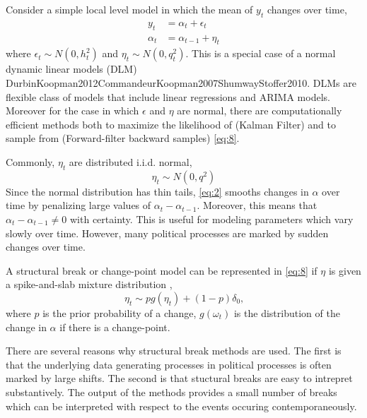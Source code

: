 \documentclass{article}
\begin{document}
Consider a simple local level model in which the mean of $y_{t}$ changes over time,
\begin{equation}
  \label{eq:8}
  \begin{aligned}
    y_t &= \alpha_t + \epsilon_t \\
    \alpha_t &= \alpha_{t-1} + \eta_{t}
  \end{aligned}
\end{equation}
where $\epsilon_{t} \sim N(0, h_{t}^{2})$ and $\eta_{t} \sim N(0, q_{t}^{2})$.
This is a special case of a normal dynamic linear models (DLM) \parencite{WestHarrison1997}{DurbinKoopman2012}{CommandeurKoopman2007}{ShumwayStoffer2010}.
DLMs are flexible class of models that include linear regressions and ARIMA models.
Moreover for the case in which $\epsilon$ and $\eta$ are normal, there are computationally efficient methods both to maximize the likelihood of (Kalman Filter) and to sample from (Forward-filter backward samples) \eqref{eq:8}.

Commonly, $\eta_{t}$ are distributed i.i.d. normal,
\begin{equation}
  \label{eq:2}
  \eta_{t} \sim N(0, q^{2})
\end{equation}
Since the normal distribution has thin tails, \eqref{eq:2} smooths changes in $\alpha$ over time by penalizing large values of $\alpha_{t} - \alpha_{t-1}$.
Moreover, this means that $\alpha_{t} - \alpha_{t-1} \neq 0$ with certainty.
This is useful for modeling parameters which vary slowly over time.
However, many political processes are marked by sudden changes over time.

A structural break or change-point model can be represented in \eqref{eq:8} if $\eta$ is given a spike-and-slab mixture distribution \parencite{GiordaniKohn2008},
\begin{equation}
  \label{eq:1}
  \eta_{t} \sim p g(\eta_{t}) + (1 - p) \delta_{0} \text{,}
\end{equation}
where $p$ is the prior probability of a change, $g(\omega_{t})$ is the distribution of the change in $\alpha$ if there is a change-point.

There are several reasons why structural break methods are used.
The first is that the underlying data generating processes in political processes is often marked by large shifts.
The second is that stuctural breaks are easy to intrepret substantively.
The output of the methods provides a small number of breaks which can be interpreted with respect to the events occuring contemporaneously.
\end{document}
